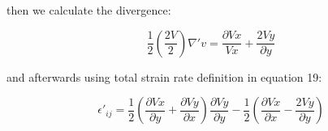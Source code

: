 \documentclass{article}
\begin{document}
    then we calculate the divergence:

    \begin{equation}
        \frac{1}{2}(\frac{2V}{2}) \nabla ' v = \frac{\partial Vx}{Vx} + \frac{2Vy}{\partial y}
    \end{equation}

    and afterwards using total strain rate definition in equation 19:

    \begin{equation}
        \epsilon ' _{ij} = \frac{1}{2}(\frac{\partial Vx}{\partial y} + \frac{\partial Vy}{\partial x})\frac{\partial Vy}{\partial y} - \frac{1}{2}(\frac{\partial Vx}{\partial x} - \frac{2Vy}{\partial y})
    \end{equation}
\end{document}
